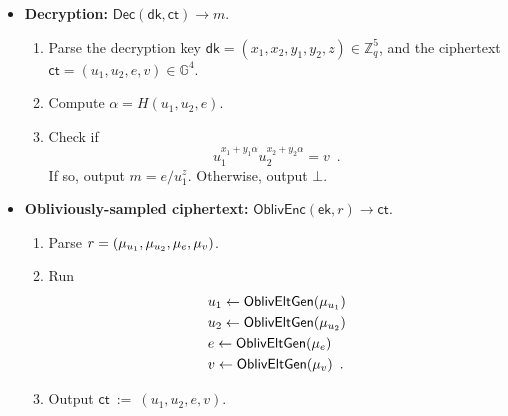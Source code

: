 \documentclass[11pt,letterpaper]{article}
\theoremstyle{plain} %
\theoremstyle{definition} %
\theoremstyle{remark} %
\newcommand{\eqdef}{\ {:=} \ }
\newcommand{\OblivEnc}{\mathsf{OblivEnc}}
\newcommand{\Dec}{\mathsf{Dec}}
\newcommand{\EncKey}{\mathsf{ek}}
\newcommand{\DecKey}{\mathsf{dk}}
\newcommand{\Msg}{m}
\newcommand{\Ct}{\mathsf{ct}}
\newcommand{\Rand}{r}
\newcommand{\Integers}{\mathbb{Z}}
\newcommand{\Group}{\mathbb{G}}
\newcommand{\GrpOrd}{q}
\newcommand{\GrpEltE}{e}
\newcommand{\GrpEltU}{u}
\newcommand{\GrpEltV}{v}
\newcommand{\Hash}{H}
\newcommand{\ExpX}{x}
\newcommand{\ExpY}{y}
\newcommand{\ExpZ}{z}
\newcommand{\Tag}{\alpha}
\begin{document}
\begin{itemize}[nolistsep]
    \item \textbf{Decryption:} $\Dec(\DecKey, \Ct) \to \Msg$.
    \begin{enumerate}[nolistsep]
        \item Parse the decryption key $\DecKey = (\ExpX_1, \ExpX_2, \ExpY_1, \ExpY_2, \ExpZ) \in \Integers_{\GrpOrd}^5$, and the ciphertext $\Ct = (\GrpEltU_1, \GrpEltU_2, \GrpEltE, \GrpEltV) \in \Group^4$.
        \item Compute $\Tag = \Hash(\GrpEltU_1, \GrpEltU_2, \GrpEltE)$.
        \item Check if
        \begin{equation*}
            \GrpEltU_1^{\ExpX_1 + \ExpY_1 \Tag} \GrpEltU_2^{\ExpX_2 + \ExpY_2 \Tag} = \GrpEltV
            \enspace.
        \end{equation*} If so, output $\Msg = \GrpEltE / \GrpEltU_1^{\ExpZ}$. Otherwise, output $\bot$.
    \end{enumerate}

    \item \textbf{Obliviously-sampled ciphertext:} $\OblivEnc(\EncKey, \Rand) \to \Ct$.
    \begin{enumerate}[nolistsep]
        \item Parse $\Rand = (\RandStr_{\GrpEltU_1}, \RandStr_{\GrpEltU_2}, \RandStr_{\GrpEltE}, \RandStr_{\GrpEltV})$.
        \item Run
        \begin{align*}
            &\GrpEltU_1 \gets \OblivEltGen( \RandStr_{\GrpEltU_1})\\
            &\GrpEltU_2 \gets \OblivEltGen( \RandStr_{\GrpEltU_2})\\
            &\GrpEltE \gets \OblivEltGen( \RandStr_{\GrpEltE})\\
            &\GrpEltV \gets \OblivEltGen( \RandStr_{\GrpEltV})
            \enspace.
        \end{align*}
        \item Output $\Ct \eqdef (\GrpEltU_1,\GrpEltU_2,\GrpEltE,\GrpEltV)$.
    \end{enumerate}


\end{itemize}
\end{document}
